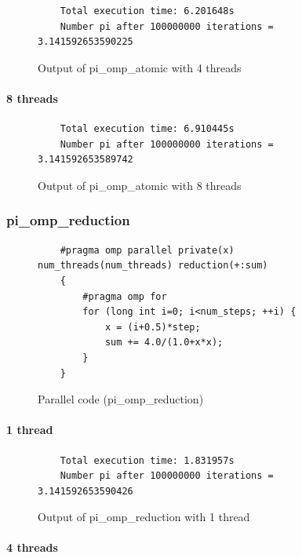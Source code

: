 \documentclass[12pt, a4paper]{article}
\begin{document}
\begin{figure}[H]
	\begin{lstlisting}
	Total execution time: 6.201648s
	Number pi after 100000000 iterations = 3.141592653590225			
	\end{lstlisting}
	\caption{Output of pi\_omp\_atomic with 4 threads}
\end{figure}

\paragraph{8 threads}

\begin{figure}[H]
	\begin{lstlisting}
	Total execution time: 6.910445s
	Number pi after 100000000 iterations = 3.141592653589742
	\end{lstlisting}
	\caption{Output of pi\_omp\_atomic with 8 threads}
\end{figure}

\subsubsection{pi\_omp\_reduction}

\begin{figure}[H]
	\begin{lstlisting}
	#pragma omp parallel private(x) num_threads(num_threads) reduction(+:sum)
    {
        #pragma omp for 
        for (long int i=0; i<num_steps; ++i) {
            x = (i+0.5)*step;
	    	sum += 4.0/(1.0+x*x);
        }
    }

	\end{lstlisting}
	
	\caption{Parallel code (pi\_omp\_reduction)}
\end{figure}

\paragraph{1 thread}

\begin{figure}[H]
	\begin{lstlisting}
	Total execution time: 1.831957s
	Number pi after 100000000 iterations = 3.141592653590426		
	\end{lstlisting}
	\caption{Output of pi\_omp\_reduction with 1 thread}
\end{figure}

\paragraph{4 threads}
\end{document}
